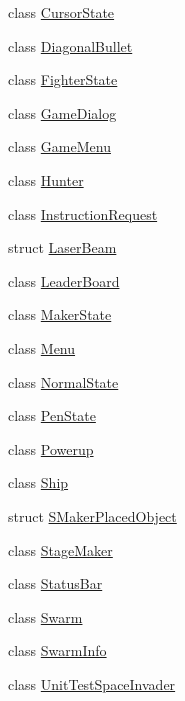 \begin{DoxyCompactItemize}
\item 
class \hyperlink{classgame_1_1CursorState}{Cursor\+State}
\item 
class \hyperlink{classgame_1_1DiagonalBullet}{Diagonal\+Bullet}
\item 
class \hyperlink{classgame_1_1FighterState}{Fighter\+State}
\item 
class \hyperlink{classgame_1_1GameDialog}{Game\+Dialog}
\item 
class \hyperlink{classgame_1_1GameMenu}{Game\+Menu}
\item 
class \hyperlink{classgame_1_1Hunter}{Hunter}
\item 
class \hyperlink{classgame_1_1InstructionRequest}{Instruction\+Request}
\item 
struct \hyperlink{structgame_1_1LaserBeam}{Laser\+Beam}
\item 
class \hyperlink{classgame_1_1LeaderBoard}{Leader\+Board}
\item 
class \hyperlink{classgame_1_1MakerState}{Maker\+State}
\item 
class \hyperlink{classgame_1_1Menu}{Menu}
\item 
class \hyperlink{classgame_1_1NormalState}{Normal\+State}
\item 
class \hyperlink{classgame_1_1PenState}{Pen\+State}
\item 
class \hyperlink{classgame_1_1Powerup}{Powerup}
\item 
class \hyperlink{classgame_1_1Ship}{Ship}
\item 
struct \hyperlink{structgame_1_1SMakerPlacedObject}{S\+Maker\+Placed\+Object}
\item 
class \hyperlink{classgame_1_1StageMaker}{Stage\+Maker}
\item 
class \hyperlink{classgame_1_1StatusBar}{Status\+Bar}
\item 
class \hyperlink{classgame_1_1Swarm}{Swarm}
\item 
class \hyperlink{classgame_1_1SwarmInfo}{Swarm\+Info}
\item 
class \hyperlink{classgame_1_1UnitTestSpaceInvader}{Unit\+Test\+Space\+Invader}
\end{DoxyCompactItemize}
